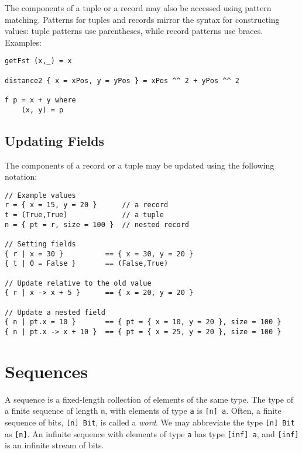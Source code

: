 The components of a tuple or a record may also be accessed using pattern
matching. Patterns for tuples and records mirror the syntax for
constructing values: tuple patterns use parentheses, while record
patterns use braces. Examples:

\begin{verbatim}
getFst (x,_) = x

distance2 { x = xPos, y = yPos } = xPos ^^ 2 + yPos ^^ 2

f p = x + y where
    (x, y) = p
\end{verbatim}

\hypertarget{updating-fields}{%
\subsection{Updating Fields}\label{updating-fields}}

The components of a record or a tuple may be updated using the following
notation:

\begin{verbatim}
// Example values
r = { x = 15, y = 20 }      // a record
t = (True,True)             // a tuple
n = { pt = r, size = 100 }  // nested record

// Setting fields
{ r | x = 30 }          == { x = 30, y = 20 }
{ t | 0 = False }       == (False,True)

// Update relative to the old value
{ r | x -> x + 5 }      == { x = 20, y = 20 }

// Update a nested field
{ n | pt.x = 10 }       == { pt = { x = 10, y = 20 }, size = 100 }
{ n | pt.x -> x + 10 }  == { pt = { x = 25, y = 20 }, size = 100 }
\end{verbatim}

\hypertarget{sequences}{%
\section{Sequences}\label{sequences}}

A sequence is a fixed-length collection of elements of the same type.
The type of a finite sequence of length \texttt{n}, with elements of
type \texttt{a} is \texttt{{[}n{]}\ a}. Often, a finite sequence of
bits, \texttt{{[}n{]}\ Bit}, is called a \emph{word}. We may abbreviate
the type \texttt{{[}n{]}\ Bit} as \texttt{{[}n{]}}. An infinite sequence
with elements of type \texttt{a} has type \texttt{{[}inf{]}\ a}, and
\texttt{{[}inf{]}} is an infinite stream of bits.

